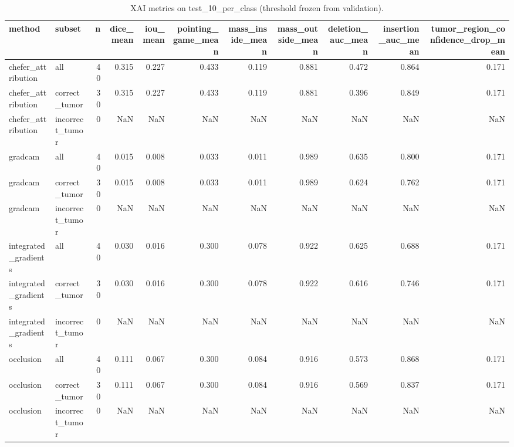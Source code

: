 \begin{table}
\caption{XAI metrics on test_10_per_class (threshold frozen from validation).}
\label{tab:xai-test_10_per_class}
\begin{tabular}{llrrrrrrrrr}
\toprule
method & subset & n & dice_mean & iou_mean & pointing_game_mean & mass_inside_mean & mass_outside_mean & deletion_auc_mean & insertion_auc_mean & tumor_region_confidence_drop_mean \\
\midrule
chefer_attribution & all & 40 & 0.315 & 0.227 & 0.433 & 0.119 & 0.881 & 0.472 & 0.864 & 0.171 \\
chefer_attribution & correct_tumor & 30 & 0.315 & 0.227 & 0.433 & 0.119 & 0.881 & 0.396 & 0.849 & 0.171 \\
chefer_attribution & incorrect_tumor & 0 & NaN & NaN & NaN & NaN & NaN & NaN & NaN & NaN \\
gradcam & all & 40 & 0.015 & 0.008 & 0.033 & 0.011 & 0.989 & 0.635 & 0.800 & 0.171 \\
gradcam & correct_tumor & 30 & 0.015 & 0.008 & 0.033 & 0.011 & 0.989 & 0.624 & 0.762 & 0.171 \\
gradcam & incorrect_tumor & 0 & NaN & NaN & NaN & NaN & NaN & NaN & NaN & NaN \\
integrated_gradients & all & 40 & 0.030 & 0.016 & 0.300 & 0.078 & 0.922 & 0.625 & 0.688 & 0.171 \\
integrated_gradients & correct_tumor & 30 & 0.030 & 0.016 & 0.300 & 0.078 & 0.922 & 0.616 & 0.746 & 0.171 \\
integrated_gradients & incorrect_tumor & 0 & NaN & NaN & NaN & NaN & NaN & NaN & NaN & NaN \\
occlusion & all & 40 & 0.111 & 0.067 & 0.300 & 0.084 & 0.916 & 0.573 & 0.868 & 0.171 \\
occlusion & correct_tumor & 30 & 0.111 & 0.067 & 0.300 & 0.084 & 0.916 & 0.569 & 0.837 & 0.171 \\
occlusion & incorrect_tumor & 0 & NaN & NaN & NaN & NaN & NaN & NaN & NaN & NaN \\
\bottomrule
\end{tabular}
\end{table}
